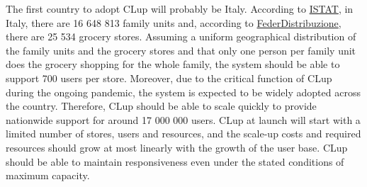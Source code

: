 \documentclass[../../main.tex]{subfiles}
\begin{document}
The first country to adopt CLup will probably be Italy. According to \href{http://dati-censimentopopolazione.istat.it/Index.aspx?DataSetCode=DICA_NUCLEI}{ISTAT}, in Italy, 
there are 16 648 813 family units and, according to \href{https://www.federdistribuzione.it/mappa-distributiva/}{FederDistribuzione}, there are 25 534 grocery stores. 
Assuming a uniform geographical distribution of the family units and the grocery stores and that only one person per family unit does the grocery shopping for the whole family, 
the system should be able to support 700 users per store. 
Moreover, due to the critical function of CLup during the ongoing pandemic, the system is expected to be widely adopted across the country. 
Therefore, CLup should be able to scale quickly to provide nationwide support for around 17 000 000 users. CLup at launch will start with a limited number of stores, users and resources, and the scale-up costs and required resources should grow at most linearly with the growth of the user base.
CLup should be able to maintain responsiveness even under the stated conditions of maximum capacity.
\end{document}
